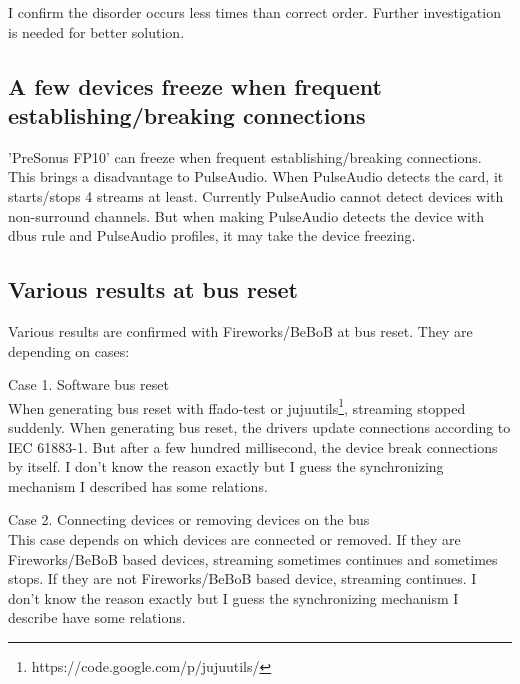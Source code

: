 \documentclass[onecolumn]{article}
\begin{document}
I confirm the disorder occurs less times than correct order. Further investigation is needed for better solution.

\subsection{A few devices freeze when frequent establishing/breaking connections}
'PreSonus FP10' can freeze when frequent establishing/breaking connections. This brings a disadvantage to PulseAudio. When PulseAudio detects the card, it starts/stops 4 streams at least. Currently PulseAudio cannot detect devices with non-surround channels. But when making PulseAudio detects the device with dbus rule and PulseAudio profiles, it may take the device freezing.

\subsection{Various results at bus reset}
Various results are confirmed with Fireworks/BeBoB at bus reset. They are depending on cases:
\begin{description}
\item{Case 1. Software bus reset} \mbox{} \\
When generating bus reset with ffado-test or jujuutils\footnote{https://code.google.com/p/jujuutils/}, streaming stopped suddenly. When generating bus reset, the drivers update connections according to IEC 61883-1. But after a few hundred millisecond, the device break connections by itself. I don't know the reason exactly but I guess the synchronizing mechanism I described has some relations.
\item{Case 2. Connecting devices or removing devices on the bus} \mbox{} \\
This case depends on which devices are connected or removed. If they are Fireworks/BeBoB based devices, streaming sometimes continues and sometimes stops. If they are not Fireworks/BeBoB based device, streaming continues. I don't know the reason exactly but I guess the synchronizing mechanism I describe have some relations. 
\end{description}
\end{document}
